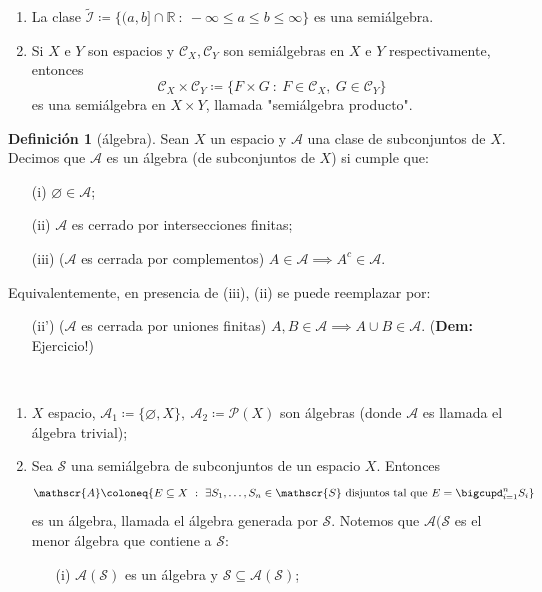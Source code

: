 \documentclass[11pt]{article}
\theoremstyle{definition} %
\newtheorem{definition}[theorem]{Definición}
\newcommand{\R}{\mathbb{R}}
\begin{document}
\begin{property}
\begin{eg}
\begin{enumerate}
			\item La clase $\widetilde{\mathcal{I}} \coloneq \{ (a,b] \cap \R \ : \ -\infty \leq a \leq b \leq \infty \}$ es una semiálgebra.

			\item Si $X$ e $Y$ son espacios y $\mathscr{C}_X, \mathscr{C}_Y$ son semiálgebras en $X$ e $Y$ respectivamente, entonces
			\[ \mathscr{C}_X \times \mathscr{C}_Y \coloneq \{ F \times G \ : \ F \in \mathscr{C}_X,\ G \in \mathscr{C}_Y \} \]
			es una semiálgebra en $X \times Y$, llamada "semiálgebra producto".
		\end{enumerate}
	\end{eg}

	\begin{definition}[álgebra]
		Sean $X$ un espacio y $\mathscr{A}$ una clase de subconjuntos de $X$. Decimos que $\mathscr{A}$ es un álgebra (de subconjuntos de $X$) si cumple que:
		\begin{enumerate}
			\item[(i)] $\varnothing \in \mathscr{A}$;
			
			\item[(ii)] $\mathscr{A}$ es cerrado por intersecciones finitas;

			\item[(iii)] ($\mathscr{A}$ es cerrada por complementos) $A \in \mathscr{A} \implies A^c \in \mathscr{A}$. 
		\end{enumerate}	
			\noindent Equivalentemente, en presencia de (iii), (ii) se puede reemplazar por:	
		\begin{enumerate}
			\item[(ii')] ($\mathscr{A}$ es cerrada por uniones finitas) $A,B\in \mathscr{A} \implies A \cup B \in \mathscr{A}$. (\textbf{Dem:} Ejercicio!)
		\end{enumerate}
	\end{definition}

	\begin{eg}~
		\begin{enumerate}
			\item $X$ espacio, $\mathscr{A}_1 \coloneq \{\varnothing, X\},\ \mathscr{A}_2 \coloneq \mathcal{P}(X)$ son álgebras (donde $\mathscr{A}$ es llamada el álgebra trivial);

			\item Sea $\mathscr{S}$ una semiálgebra de subconjuntos de un espacio $X$. Entonces 
			\[ \mathscr{A} \coloneq \{ E \subseteq X \ : \ \exists S_1,\dots,S_n \in \mathscr{S} \text{ disjuntos tal que } E = \displaystyle\bigcupd_{i=1}^{n} S_i \} \] 
			es un álgebra, llamada el álgebra generada por $\mathscr{S}$. Notemos que $\mathscr{A}(\mathscr{S}$ es el menor álgebra que contiene a $\mathscr{S}$:
			\begin{enumerate}
				\item[(i)] $\mathscr{A}(\mathscr{S})$ es un álgebra y $\mathscr{S} \subseteq \mathscr{A}(\mathscr{S})$;


\end{enumerate}
\end{enumerate}
\end{eg}
\end{property}
\end{document}
